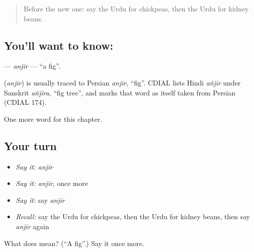 \label{lesson:UR-C174-anjir}



\begin{quote}
Before the new one: say the Urdu for chickpeas, then the Urdu for kidney beans.
\end{quote}

\subsection*{You'll want to know: }
\textbf{} — \emph{anjīr} — \textquotedblleft{}a fig\textquotedblright{}.

\begin{cousinweb}
\textbf{} (\emph{anjīr}) is usually traced to Persian \emph{anjīr}, \textquotedblleft{}fig\textquotedblright{}. CDIAL lists Hindi \emph{añjīr} under Sanskrit \emph{añjīra}, \textquotedblleft{}fig tree\textquotedblright{}, and marks that word as itself taken from Persian (CDIAL 174).
\end{cousinweb}

\begin{grammarlens}[title={What you've built}]
One more word for this chapter.
\end{grammarlens}

\subsection*{Your turn}
\begin{itemize}
\raggedright
  \item \emph{Say it:} \emph{anjīr}
  \item \emph{Say it:} \emph{anjīr}, once more
  \item \emph{Say it:} say \emph{anjīr}
  \item \emph{Recall:} say the Urdu for chickpeas, then the Urdu for kidney beans, then say \emph{anjīr} again
\end{itemize}

\begin{tcolorbox}[breakable,colback=teal!4,colframe=teal!35!black,title={Before you move on}]
What does  mean? (\textquotedblleft{}A fig\textquotedblright{}.) Say it once more.
\end{tcolorbox}
